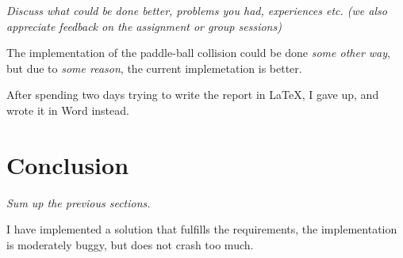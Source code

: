 \documentclass[11pt]{article}
\begin{document}
    \emph{Discuss what could be done better, problems you had, experiences etc. (we also appreciate feedback on the assignment or group sessions) }

    The implementation of the paddle-ball collision could be done \emph{some other way}, but due to \emph{some reason}, the current implemetation is better.

    After spending two days trying to write the report in \LaTeX, I gave up, and wrote it in Word instead.


    \section{Conclusion}

    \emph{Sum up the previous sections.}

    I have implemented a solution that fulfills the requirements, the implementation is moderately buggy, but does not crash too much.


    
    
\end{document}
